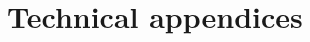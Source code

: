 	\part{Technical appendices}
        \begin{appendices}
            
        
            
            
            
            
            
        \end{appendices}
	
	\printbibliography
	
	\printindex

